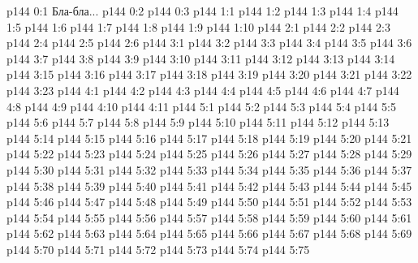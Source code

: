 \author{Промежуточные создания}
\vs p144 0:1  Бла-бла...
\vs p144 0:2 
\vs p144 0:3 
\vs p144 1:1 
\vs p144 1:2 
\vs p144 1:3 
\vs p144 1:4 
\vs p144 1:5 
\vs p144 1:6 \pc 
\vs p144 1:7 
\vs p144 1:8 \pc 
\vs p144 1:9 
\vs p144 1:10 
\vs p144 2:1 
\vs p144 2:2 
\vs p144 2:3 
\vs p144 2:4 
\vs p144 2:5 
\vs p144 2:6 
\vs p144 3:1 
\vs p144 3:2 
\vspace*{1ex}
\vs p144 3:3 
\vs p144 3:4 
\vs p144 3:5 
\vs p144 3:6 
\vs p144 3:7 
\vs p144 3:8 
\vs p144 3:9 
\vs p144 3:10 
\vs p144 3:11 
\vs p144 3:12 
\vspace*{1ex}
\vs p144 3:13 \pc 
\vs p144 3:14 
\vs p144 3:15 
\vs p144 3:16 
\vs p144 3:17 
\vs p144 3:18 
\vs p144 3:19 
\vs p144 3:20 
\vs p144 3:21 
\vs p144 3:22 
\vs p144 3:23 \pc 
{}
\vs p144 4:1 
\vs p144 4:2 \pc 
\vs p144 4:3 
\vs p144 4:4 
\vs p144 4:5 
\vs p144 4:6 
\vs p144 4:7 
\vs p144 4:8 
\vs p144 4:9 
\vs p144 4:10 \pc 
\vs p144 4:11 
\vs p144 5:1 
\vspace*{1ex}
\vs p144 5:2 
\vs p144 5:3 
\vs p144 5:4 
\vs p144 5:5 
\vs p144 5:6 
\vs p144 5:7 
\vs p144 5:8 
\vs p144 5:9 
\vs p144 5:10 
\vs p144 5:11 
\vs p144 5:12 
\vs p144 5:13 
\vs p144 5:14 
\vs p144 5:15 
\vs p144 5:16 
\vs p144 5:17 
\vs p144 5:18 
\vs p144 5:19 
\vs p144 5:20 
\vs p144 5:21 
\vs p144 5:22 
\vs p144 5:23 
\vs p144 5:24 
\vs p144 5:25 
\vs p144 5:26 
\vs p144 5:27 
\vs p144 5:28 
\vs p144 5:29 
\vs p144 5:30 
\vs p144 5:31 
\vs p144 5:32 
\vs p144 5:33 
\vs p144 5:34 
\vs p144 5:35 
\vs p144 5:36 
\vs p144 5:37 
\vs p144 5:38 
\vs p144 5:39 
\vs p144 5:40 
\vs p144 5:41 
\vs p144 5:42 
\vs p144 5:43 
\vs p144 5:44 
\vs p144 5:45 
\vs p144 5:46 
\vs p144 5:47 
\vs p144 5:48 
\vs p144 5:49 
\vs p144 5:50 
\vs p144 5:51 
\vs p144 5:52 
\vs p144 5:53 
\vs p144 5:54 
\vs p144 5:55 
\vs p144 5:56 
\vs p144 5:57 
\vs p144 5:58 
\vs p144 5:59 
\vs p144 5:60 
\vs p144 5:61 
\vs p144 5:62 
\vs p144 5:63 
\vs p144 5:64 
\vs p144 5:65 
\vs p144 5:66 
\vs p144 5:67 
\vs p144 5:68 
\vs p144 5:69 
\vs p144 5:70 
\vs p144 5:71 
\vs p144 5:72 
\vs p144 5:73 
\vs p144 5:74 
\vs p144 5:75 
